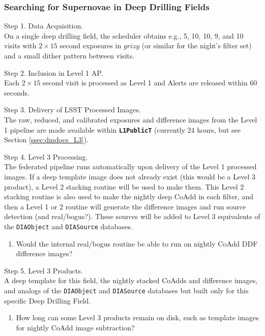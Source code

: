 \documentclass[DM,lsstdraft,toc]{lsstdoc}
\begin{document}
\subsubsection{Searching for Supernovae in Deep Drilling Fields}

Step 1. Data Acquisition. \\ On a single deep drilling field, the scheduler obtains e.g., 5, 10, 10, 9, and 10 visits with $2\times15$ second exposures in $grizy$ (or similar for the night's filter set) and a small dither pattern between visits.

Step 2. Inclusion in Level 1 AP. \\ Each $2\times15$ second visit is processed as Level 1 and Alerts are released within 60 seconds.

Step 3. Delivery of LSST Processed Images. \\ The raw, reduced, and calibrated exposures and difference images from the Level 1 pipeline are made available within {\tt \textbf{L1PublicT}} (currently 24 hours, but see Section \ref{ssec:dmdocs_L3}).

Step 4. Level 3 Processing. \\ The federated pipeline runs automatically upon delivery of the Level 1 processed images. If a deep template image does not already exist (this would be a Level 3 product), a Level 2 stacking routine will be used to make them. This Level 2 stacking routine is also used to make the nightly deep CoAdd in each filter, and then a Level 1 or 2 routine will generate the difference images and run source detection (and real/bogus?). These sources will be added to Level 3 equivalents of the {\tt DIAObject} and {\tt DIASource} databases. 
\begin{enumerate}[resume,topsep=-10pt,label= \textbf{Concern \Roman*.}] \item \label{C16} Would the internal real/bogus routine be able to run on nightly CoAdd DDF difference images? \end{enumerate}

Step 5. Level 3 Products. \\ A deep template for this field, the nightly stacked CoAdds and difference images, and analogs of the {\tt DIAObject} and {\tt DIASource} databases but built only for this specific Deep Drilling Field.
\begin{enumerate}[resume,topsep=-10pt,label= \textbf{Concern \Roman*.}] \item \label{C17} How long can some Level 3 products remain on disk, such as template images for nightly CoAdd image subtraction? \end{enumerate}
\end{document}
